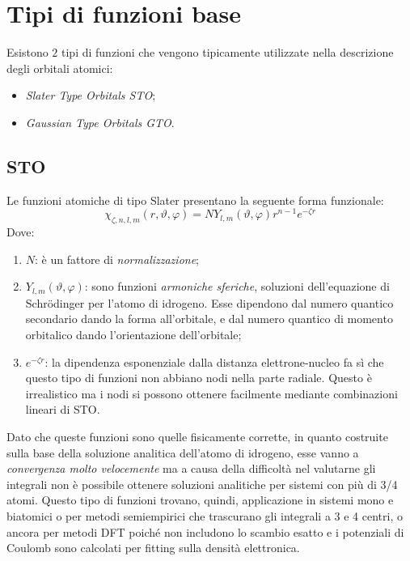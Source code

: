 \documentclass[oneside]{amsbook}
\numberwithin{section}{chapter}
\numberwithin{equation}{section}
\numberwithin{figure}{section}
\begin{document}
\section{Tipi di funzioni base}
Esistono $2$ tipi di funzioni che vengono tipicamente utilizzate nella descrizione degli orbitali atomici:
\begin{itemize}
\item \emph{Slater Type Orbitals STO};
\item \emph{Gaussian Type Orbitals GTO}.
\end{itemize}
\subsection{STO }
Le funzioni atomiche di tipo Slater presentano la seguente forma funzionale:
\begin{equation}
\chi_{\zeta, n, l, m}(r, \vartheta, \varphi)= N Y_{l,m}(\vartheta, \varphi) r^{n-1} e^{-\zeta r}
\end{equation}
Dove:
\begin{enumerate}
\item $N$: è un fattore di \emph{normalizzazione};
\item $Y_{l,m}(\vartheta, \varphi)$: sono funzioni \emph{armoniche sferiche}, soluzioni dell'equazione di Schr\"odinger per l'atomo di idrogeno. Esse dipendono dal numero quantico secondario dando la forma all'orbitale, e dal numero quantico di momento orbitalico dando l'orientazione dell'orbitale;
\item $e^{-\zeta r}$: la dipendenza esponenziale dalla distanza elettrone-nucleo fa sì che questo tipo di funzioni non abbiano nodi nella parte radiale. Questo è irrealistico ma i nodi si possono ottenere facilmente mediante combinazioni lineari di STO.
\end{enumerate}
Dato che queste funzioni sono quelle fisicamente corrette, in quanto costruite sulla base della soluzione analitica dell'atomo di idrogeno, esse vanno a \emph{convergenza molto velocemente} ma a causa della difficoltà nel valutarne gli integrali non è possibile ottenere soluzioni analitiche per sistemi con più di 3/4 atomi. 
Questo tipo di funzioni trovano, quindi, applicazione in sistemi mono e biatomici o per metodi semiempirici che trascurano gli integrali a 3 e 4 centri, o ancora per metodi DFT poiché non includono lo scambio esatto e i potenziali di Coulomb sono calcolati per fitting sulla densità elettronica.
\end{document}
